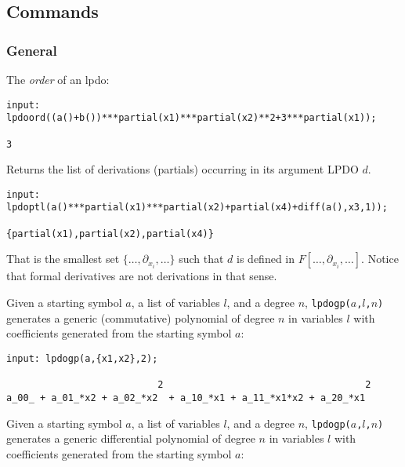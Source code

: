 \subsection{Commands}

\subsubsection{General}
The \emph{order} of an lpdo:
\begin{footnotesize}
\begin{verbatim}
input: lpdoord((a()+b())***partial(x1)***partial(x2)**2+3***partial(x1));

3
\end{verbatim}
\end{footnotesize}
%
Returns the list of derivations (partials) occurring in its argument
LPDO $d$.

\begin{footnotesize}
\begin{verbatim}
input: lpdoptl(a()***partial(x1)***partial(x2)+partial(x4)+diff(a(),x3,1));

{partial(x1),partial(x2),partial(x4)}
\end{verbatim}
\end{footnotesize}
That is the smallest set $\{\dots,\partial_{x_i},\dots\}$ such that
$d$ is defined in $F[\dots,\partial_{x_i},\dots]$. Notice that formal
derivatives are not derivations in that sense.

Given a starting symbol $a$, a list of variables $l$, and a degree
$n$, \texttt{lpdogp($a$,$l$,$n$)} generates a generic (commutative)
polynomial of degree $n$ in variables $l$ with coefficients generated
from the starting symbol $a$:

\begin{footnotesize}
\begin{verbatim}
input: lpdogp(a,{x1,x2},2);

                           2                                    2
a_00_ + a_01_*x2 + a_02_*x2  + a_10_*x1 + a_11_*x1*x2 + a_20_*x1
\end{verbatim}
\end{footnotesize}

Given a starting symbol $a$, a list of variables $l$, and a degree
$n$, \texttt{lpdogp($a$,$l$,$n$)} generates a generic differential
polynomial of degree $n$ in variables $l$ with coefficients generated
from the starting symbol $a$:

